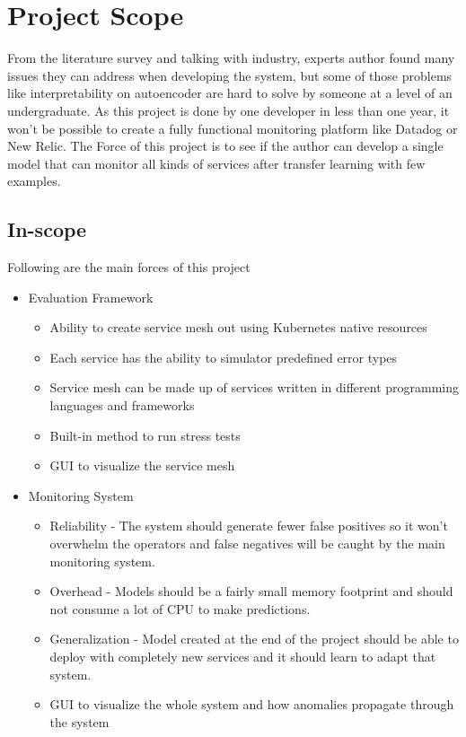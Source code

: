 \section{Project Scope}

From the literature survey and talking with industry, experts author found many issues they can address when developing the system, but some of those problems like interpretability on autoencoder \citep{ribeiro2016should} are hard to solve by someone at a level of an undergraduate. As this project is done by one developer in less than one year, it won't be possible to create a fully functional monitoring platform like Datadog or New Relic. The Force of this project is to see if the author can develop a single model that can monitor all kinds of services after transfer learning with few examples. 

\subsection{In-scope}
Following are the main forces of this project
\begin{itemize}
    \item Evaluation Framework
    \begin{itemize}
        \item Ability to create service mesh out using Kubernetes native resources
        \item Each service has the ability to simulator predefined error types
        \item Service mesh can be made up of services written in different programming languages and  frameworks 
        \item Built-in method to run stress tests
        \item GUI to visualize the service mesh
    \end{itemize}
    \item Monitoring System
    \begin{itemize}
        \item Reliability - The system should generate fewer false positives so it won't overwhelm the operators and false negatives will be caught by the main monitoring system.
        \item Overhead - Models should be a fairly small memory footprint and should not consume a lot of CPU to make predictions.
        \item Generalization - Model created at the end of the project should be able to deploy with completely new services and it should learn to adapt that system.
        \item GUI to visualize the whole system and how anomalies propagate through the system
    \end{itemize}
\end{itemize}


